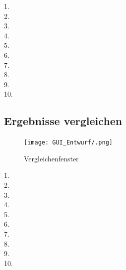 \begin{description}

\item[1. ] 

\item[2. ] 

\item[3. ] 

\item[4. ] 

\item[5. ] 

\item[6. ] 

\item[7. ] 

\item[8. ] 

\item[9. ] 

\item[10. ] 

\end{description}

\pagebreak


\subsection{Ergebnisse vergleichen}

\begin{figure}[hp] 
  \centering
     \texttt{[image: GUI\_Entwurf/.png]}
  \caption{Vergleichenfenster}
  \label{fig:Bild1}
\end{figure}

\begin{description}

\item[1. ] 

\item[2. ] 

\item[3. ] 

\item[4. ] 

\item[5. ] 

\item[6. ] 

\item[7. ] 

\item[8. ] 

\item[9. ] 

\item[10. ] 

\end{description}



